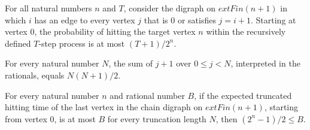 \begin{theorem}
\label{Randomized.hitProb_chainDigraph_le}
\leanok
{}
For all natural numbers $n$ and $T$, consider the digraph on $	ext{Fin}(n+1)$ in which
$i$ has an edge to every vertex $j$ that is $0$ or satisfies $j=i+1$. Starting at vertex
$0$, the probability of hitting the target vertex $n$ within the recursively defined
$T$-step process is at most $(T+1)/2^n$.
\end{theorem}

\begin{theorem}
\label{Randomized.sum_range_succ_cast}
\leanok
{}
For every natural number $N$, the sum of $j+1$ over $0\le j<N$, interpreted in the
rationals, equals $N(N+1)/2$.
\end{theorem}

\begin{theorem}
\label{Randomized.hitTime_chainDigraph_ge}
\leanok
{}
For every natural number $n$ and rational number $B$, if the expected truncated hitting
time of the last vertex in the chain digraph on $	ext{Fin}(n+1)$, starting from vertex
$0$, is at most $B$ for every truncation length $N$, then $(2^n-1)/2\le B$.
\end{theorem}
